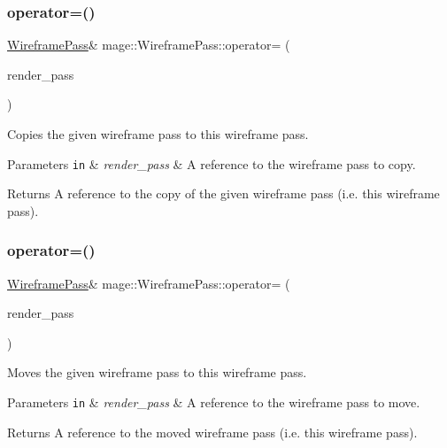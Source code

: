 \subsubsection{\texorpdfstring{operator=()}{operator=()}\hspace{0.1cm}{\footnotesize\ttfamily [1/2]}}
{\footnotesize\ttfamily \hyperlink{classmage_1_1_wireframe_pass}{Wireframe\+Pass}\& mage\+::\+Wireframe\+Pass\+::operator= (\begin{DoxyParamCaption}\item[{const \hyperlink{classmage_1_1_wireframe_pass}{Wireframe\+Pass} \&}]{render\+\_\+pass }\end{DoxyParamCaption})\hspace{0.3cm}{\ttfamily [delete]}}

Copies the given wireframe pass to this wireframe pass.


\begin{DoxyParams}[1]{Parameters}
\mbox{\tt in}  & {\em render\+\_\+pass} & A reference to the wireframe pass to copy. \\
\hline
\end{DoxyParams}
\begin{DoxyReturn}{Returns}
A reference to the copy of the given wireframe pass (i.\+e. this wireframe pass). 
\end{DoxyReturn}
\hypertarget{classmage_1_1_wireframe_pass_abd90640d63b9ce0c44b87de87d06910c}{}\label{classmage_1_1_wireframe_pass_abd90640d63b9ce0c44b87de87d06910c} 
\subsubsection{\texorpdfstring{operator=()}{operator=()}\hspace{0.1cm}{\footnotesize\ttfamily [2/2]}}
{\footnotesize\ttfamily \hyperlink{classmage_1_1_wireframe_pass}{Wireframe\+Pass}\& mage\+::\+Wireframe\+Pass\+::operator= (\begin{DoxyParamCaption}\item[{\hyperlink{classmage_1_1_wireframe_pass}{Wireframe\+Pass} \&\&}]{render\+\_\+pass }\end{DoxyParamCaption})\hspace{0.3cm}{\ttfamily [delete]}}

Moves the given wireframe pass to this wireframe pass.


\begin{DoxyParams}[1]{Parameters}
\mbox{\tt in}  & {\em render\+\_\+pass} & A reference to the wireframe pass to move. \\
\hline
\end{DoxyParams}
\begin{DoxyReturn}{Returns}
A reference to the moved wireframe pass (i.\+e. this wireframe pass). 
\end{DoxyReturn}
\hypertarget{classmage_1_1_wireframe_pass_a190f6a6a916949b6b37d5b70c9451008}{}\label{classmage_1_1_wireframe_pass_a190f6a6a916949b6b37d5b70c9451008} 

